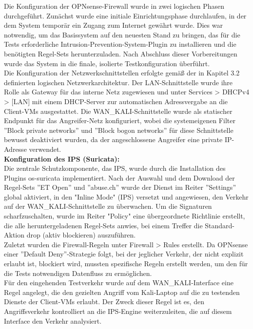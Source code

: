 Die Konfiguration der OPNsense-Firewall wurde in zwei logischen Phasen durchgeführt. Zunächst wurde eine initiale Einrichtungsphase durchlaufen, in der dem System temporär ein Zugang zum Internet gewährt wurde. Dies war notwendig, um das Basissystem auf den neuesten Stand zu bringen, das für die Tests erforderliche Intrusion-Prevention-System-Plugin zu installieren und die benötigten Regel-Sets herunterzuladen. Nach Abschluss dieser Vorbereitungen wurde das System in die finale, isolierte Testkonfiguration überführt.\\

Die Konfiguration der Netzwerkschnittstellen erfolgte gemäß der in Kapitel 3.2 definierten logischen Netzwerkarchitektur. Der LAN-Schnittstelle wurde ihre Rolle als Gateway für das interne Netz zugewiesen und unter Services > DHCPv4 > [LAN] mit einem DHCP-Server zur automatischen Adressvergabe an die Client-VMs ausgestattet. Die WAN\_KALI-Schnittstelle wurde als statischer Endpunkt für das Angreifer-Netz konfiguriert, wobei die systemeigenen Filter ''Block private networks'' und ''Block bogon networks'' für diese Schnittstelle bewusst deaktiviert wurden, da der angeschlossene Angreifer eine private IP-Adresse verwendet.\\

\textbf{Konfiguration des IPS (Suricata):}\\
Die zentrale Schutzkomponente, das IPS, wurde durch die Installation des Plugins os-suricata implementiert. Nach der Auswahl und dem Download der Regel-Sets ''ET Open'' und ''abuse.ch'' wurde der Dienst im Reiter ''Settings'' global aktiviert, in den "Inline Mode" (IPS) versetzt und angewiesen, den Verkehr auf der WAN\_KALI-Schnittstelle zu überwachen. Um die Signaturen scharfzuschalten, wurde im Reiter "Policy" eine übergeordnete Richtlinie erstellt, die alle heruntergeladenen Regel-Sets anwies, bei einem Treffer die Standard-Aktion drop (aktiv blockieren) auszuführen.\\

Zuletzt wurden die Firewall-Regeln unter Firewall > Rules erstellt. Da OPNsense einer ''Default Deny''-Strategie folgt, bei der jeglicher Verkehr, der nicht explizit erlaubt ist, blockiert wird, mussten spezifische Regeln erstellt werden, um den für die Tests notwendigen Datenfluss zu ermöglichen.\\
Für den eingehenden Testverkehr wurde auf dem WAN\_KALI-Interface eine Regel angelegt, die den gezielten Angriff vom Kali-Laptop auf die zu testenden Dienste der Client-VMs erlaubt. Der Zweck dieser Regel ist es, den Angriffsverkehr kontrolliert an die IPS-Engine weiterzuleiten, die auf diesem Interface den Verkehr analysiert.\\

